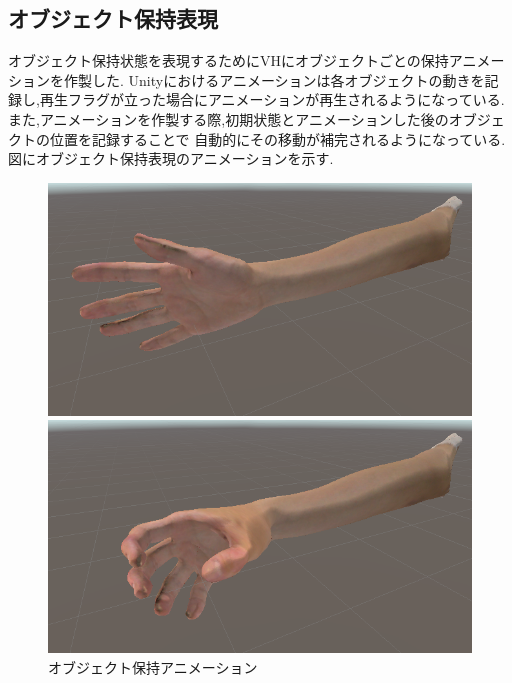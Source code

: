 \documentclass{ltjsreport}
\begin{document}
		\subsection{オブジェクト保持表現}
			オブジェクト保持状態を表現するためにVHにオブジェクトごとの保持アニメーションを作製した.
			Unityにおけるアニメーションは各オブジェクトの動きを記録し,再生フラグが立った場合にアニメーションが再生されるようになっている.
			また,アニメーションを作製する際,初期状態とアニメーションした後のオブジェクトの位置を記録することで
			自動的にその移動が補完されるようになっている.図にオブジェクト保持表現のアニメーションを示す.
			\begin{figure}[H]
			\centering
			\begin{minipage}{0.45\columnwidth}
			\centering
			\includegraphics[width = \columnwidth]{../figs/nutralHand.png}
			\end{minipage}
			\hspace{0.04\columnwidth}
			\begin{minipage}{0.45\columnwidth}
			\centering
			\includegraphics[width = \columnwidth]{../figs/grapsphereHand.png}
			\end{minipage}
			\caption{オブジェクト保持アニメーション}
			\label{fig:ObjectHold}
			\end{figure}
\end{document}
